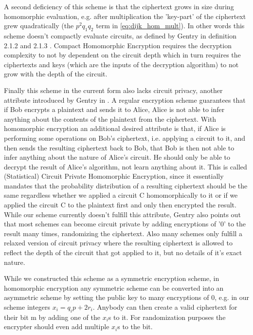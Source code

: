 A second deficiency of this scheme is that the ciphertext grows in size during homomorphic evaluation, e.g. after multiplication the 'key-part' of the ciphertext grew quadratically (the $p^2 q_1 q_2$ term in \ref{eq:dijk_hom_mult}). In other words this scheme doesn't compactly evaluate circuits, as defined by Gentry in definition 2.1.2 and 2.1.3 \cite{gentry_fully_2009}. Compact Homomorphic Encryption requires the decryption complexity to not by dependent on the circuit depth which in turn requires the ciphertexts and keys (which are the inputs of the decryption algorithm) to not grow with the depth of the circuit.

Finally this scheme in the current form also lacks circuit privacy, another attribute introduced by Gentry in \cite{gentry_fully_2009}. A regular encryption scheme guarantees that if Bob encrypts a plaintext and sends it to Alice, Alice is not able to infer anything about the contents of the plaintext from the ciphertext. With homomorphic encryption an additional desired attribute is that, if Alice is performing some operations on Bob's ciphertext, i.e. applying a circuit to it, and then sends the resulting ciphertext back to Bob, that Bob is then not able to infer anything about the nature of Alice's circuit. He should only be able to decrypt the result of Alice's algorithm, not learn anything about it. This is called (Statistical) Circuit Private Homomorphic Encryption, since it essentially mandates that the probability distribution of a resulting ciphertext should be the same regardless whether we applied a circuit C homomorphically to it or if we applied the circuit C to the plaintext first and only then encrypted the result. While our scheme currently doesn't fulfill this attribute, Gentry also points out that most schemes can become circuit private by adding encryptions of '0' to the result many times, randomizing the ciphertext. Also many schemes only fulfill a relaxed version of circuit privacy where the resulting ciphertext is allowed to reflect the depth of the circuit that got applied to it, but no details of it's exact nature. \cite{gentry_fully_2009}

\begin{remark}
    While we constructed this scheme as a symmetric encryption scheme, in homomorphic encryption any symmetric scheme can be converted into an asymmetric scheme by setting the public key to many encryptions of 0, e.g. in our scheme integers $x_i = q_i p + 2r_i$. Anybody can then create a valid ciphertext for their bit m by adding one of the $x_i$s to it. For randomization purposes the encrypter should even add multiple $x_i$s to the bit. \cite{van_dijk_fully_2010}
\end{remark}

